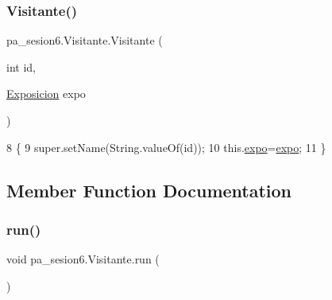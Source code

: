 \subsubsection{\texorpdfstring{Visitante()}{Visitante()}}
{\footnotesize\ttfamily pa\+\_\+sesion6.\+Visitante.\+Visitante (\begin{DoxyParamCaption}\item[{int}]{id,  }\item[{\mbox{\hyperlink{classpa__sesion6_1_1_exposicion}{Exposicion}}}]{expo }\end{DoxyParamCaption})\hspace{0.3cm}{\ttfamily [inline]}}


\begin{DoxyCode}
8     \{
9         super.setName(String.valueOf(\textcolor{keywordtype}{id}));
10         this.\mbox{\hyperlink{classpa__sesion6_1_1_visitante_a09960f68f8c9a0d5d44bd607c11d6675}{expo}}=\mbox{\hyperlink{classpa__sesion6_1_1_visitante_a09960f68f8c9a0d5d44bd607c11d6675}{expo}};
11     \}
\end{DoxyCode}


\subsection{Member Function Documentation}
\mbox{\label{classpa__sesion6_1_1_visitante_ac241b7a933b87a209c0c89b357a8d4ec}} 
\subsubsection{\texorpdfstring{run()}{run()}}
{\footnotesize\ttfamily void pa\+\_\+sesion6.\+Visitante.\+run (\begin{DoxyParamCaption}{ }\end{DoxyParamCaption})\hspace{0.3cm}{\ttfamily [inline]}}


